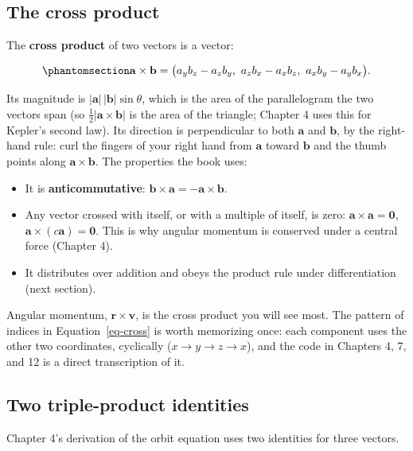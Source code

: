 \documentclass[
  10.5pt,
  letterpaper,
]{scrbook}
\providecommand{\tightlist}{%
  \setlength{\itemsep}{0pt}\setlength{\parskip}{0pt}}
\theoremstyle{definition}
\theoremstyle{plain}
\theoremstyle{remark}
\begin{document}
\subsection{The cross product}\label{the-cross-product}

The \textbf{cross product} of two vectors is a vector:

\begin{equation}\protect\phantomsection\label{eq-cross}{
\mathbf{a}\times\mathbf{b} = \big(a_y b_z - a_z b_y,\ a_z b_x - a_x b_z,\ a_x b_y - a_y b_x\big).
}\end{equation}

Its magnitude is \(|\mathbf{a}|\,|\mathbf{b}|\sin\theta\), which is the
area of the parallelogram the two vectors span (so
\(\tfrac12|\mathbf{a}\times\mathbf{b}|\) is the area of the triangle;
Chapter 4 uses this for Kepler's second law). Its direction is
perpendicular to both \(\mathbf{a}\) and \(\mathbf{b}\), by the
right-hand rule: curl the fingers of your right hand from \(\mathbf{a}\)
toward \(\mathbf{b}\) and the thumb points along
\(\mathbf{a}\times\mathbf{b}\). The properties the book uses:

\begin{itemize}
\tightlist
\item
  It is \textbf{anticommutative}:
  \(\mathbf{b}\times\mathbf{a} = -\mathbf{a}\times\mathbf{b}\).
\item
  Any vector crossed with itself, or with a multiple of itself, is zero:
  \(\mathbf{a}\times\mathbf{a} = \mathbf{0}\),
  \(\mathbf{a}\times(c\mathbf{a}) = \mathbf{0}\). This is why angular
  momentum is conserved under a central force (Chapter 4).
\item
  It distributes over addition and obeys the product rule under
  differentiation (next section).
\end{itemize}

Angular momentum, \(\mathbf{r}\times\mathbf{v}\), is the cross product
you will see most. The pattern of indices in Equation~\ref{eq-cross} is
worth memorizing once: each component uses the other two coordinates,
cyclically (\(x \to y \to z \to x\)), and the code in Chapters 4, 7, and
12 is a direct transcription of it.

\subsection{Two triple-product
identities}\label{two-triple-product-identities}

Chapter 4's derivation of the orbit equation uses two identities for
three vectors.
\end{document}
